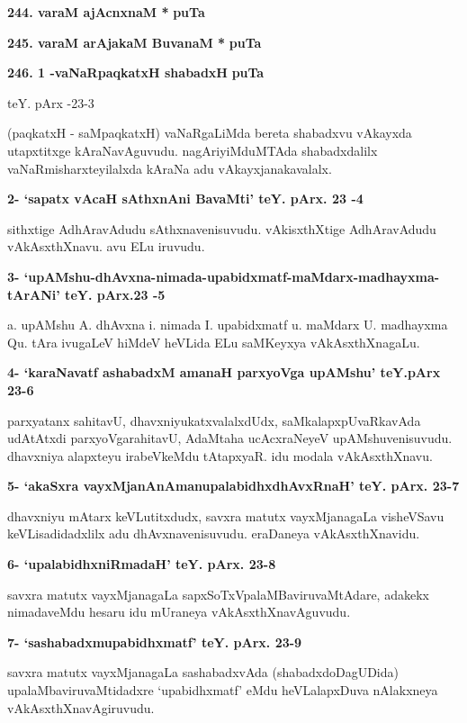 \medskip
\noindent
\textbf{244. varaM ajAcnxnaM *} \hfill{\bf puTa \pageref{94}}

\medskip
\noindent
\textbf{245. varaM arAjakaM BuvanaM *} \hfill{\bf puTa \pageref{94}}

\medskip
\noindent
\textbf{246. 1 -vaNaRpaqkatxH shabadxH} \hfill{\bf puTa \pageref{153}}

\hfill{teY. pArx -23-3}

\smallskip
(paqkatxH - saMpaqkatxH) vaNaRgaLiMda bereta shabadxvu vAkayxda utapxtitxge kAraNavAgu\-vudu. nagAri\-yiMduM\-TAda shabadxdalilx vaNaRmisharxteyilalxda kAraNa adu vAkayxjanakavalalx.

\medskip
\noindent
\textbf{2- `sapatx vAcaH sAthxnAni BavaMti' teY. pArx. 23 -4}

\smallskip
sithxtige AdhAravAdudu sAthxnavenisuvudu. vAkisxthXtige AdhAravAdudu vAkAsxthXnavu. avu ELu iru\-vudu.


\medskip
\noindent
\textbf{3- `upAMshu-dhAvxna-nimada-upabidxmatf-maMdarx-madhayxma-tArANi' teY. pArx.23 -5}

\smallskip
a. upAMshu A. dhAvxna i. nimada I. upabidxmatf u. maMdarx U. madhayxma Qu. tAra ivu\-gaLeV hiMdeV heVLida ELu saMKeyxya vAkAsxthXnagaLu.

\medskip
\noindent
\textbf{4- `karaNavatf ashabadxM amanaH parxyoVga upAMshu' teY.pArx 23-6}

\smallskip
parxyatanx sahitavU, dhavxniyukatxvalalxdUdx, saMkalapxpUvaRkavAda udAtAtxdi parxyoVgarahitavU, AdaM\-taha ucAcxraNeyeV upAMshuvenisuvudu. dhavxniya alapxteyu irabeVkeMdu tAtapxyaR. idu modala vAkAsxthXnavu.

\eject

\noindent
\textbf{5- `akaSxra vayxMjanAnAmanupalabidhxdhAvxRnaH' teY. pArx. 23-7}

\smallskip
dhavxniyu mAtarx keVLutitxdudx, savxra matutx vayxMjanagaLa visheVSavu keVLisadidadxlilx adu dhAvxnavenisuvudu. eraDaneya vAkAsxthXnavidu.

\medskip
\noindent
\textbf{6- `upalabidhxniRmadaH' teY. pArx. 23-8}

\smallskip
savxra matutx vayxMjanagaLa sapxSoTxVpalaMBaviruvaMtAdare, adakekx nimadaveMdu hesaru idu mUra\-neya vAkAsxthXnavAguvudu.


\medskip
\noindent
\textbf{7- `sashabadxmupabidhxmatf' teY. pArx. 23-9}

\smallskip
savxra matutx vayxMjanagaLa sashabadxvAda (shabadxdoDagUDida) upalaMbaviruvaMtidadxre `upabidhxmatf' eMdu heVLalapxDuva nAlakxneya vAkAsxthXnavAgiruvudu.

